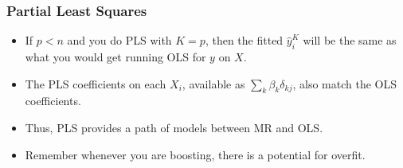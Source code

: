 \documentclass[
  shownotes,
  xcolor={svgnames},
  hyperref={colorlinks,citecolor=DarkBlue,linkcolor=DarkRed,urlcolor=DarkBlue}
  , aspectratio=169]{beamer}
\begin{document}
\begin{frame}[fragile]
\frametitle{Partial Least Squares }

\begin{itemize}
\item If $p < n$ and you do PLS with $K = p$, then the fitted $\hat{y}^K_i$ will be the same as what you would get running OLS for $y$ on $X$.
\medskip
\item The PLS coefficients on each $X_{i}$, available as $\sum_k \beta_{k} \delta_{kj}$, also match the OLS coefficients. 
\medskip
\item Thus, PLS provides a path of models between MR and OLS.
\medskip
 \item Remember whenever you are boosting, there is a potential for overfit. 
\end{itemize}

\end{frame}
\end{document}
